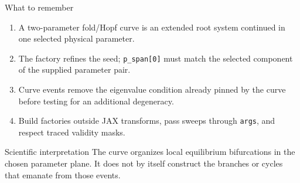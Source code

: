 \begin{frame}{What to remember}
\begin{enumerate}
  \item A two-parameter fold/Hopf curve is an extended root system continued
        in one selected physical parameter.
  \item The factory refines the seed; \texttt{p\_span[0]} must match the
        selected component of the supplied parameter pair.
  \item Curve events remove the eigenvalue condition already pinned by the
        curve before testing for an additional degeneracy.
  \item Build factories outside JAX transforms, pass sweeps through
        \texttt{args}, and respect traced validity masks.
\end{enumerate}
\vfill
\begin{alertblock}{Scientific interpretation}
The curve organizes local equilibrium bifurcations in the chosen parameter
plane. It does not by itself construct the branches or cycles that emanate
from those events.
\end{alertblock}
\end{frame}
